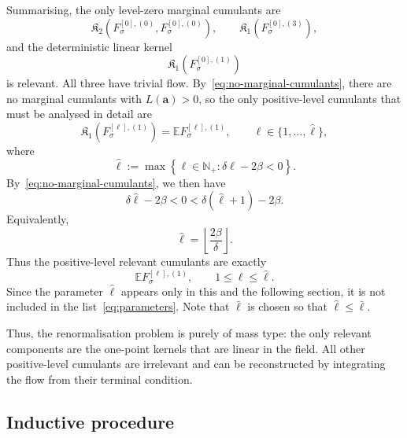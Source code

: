 \documentclass{article}
\numberwithin{equation}{section}
\newcommand{\assign}{:=}
\theoremstyle{plain}
\theoremstyle{definition}
\begin{document}
Summarising, the only level-zero marginal cumulants are
\[
  \mathfrak{K}_2 (F^{[0], (0)}_{\sigma}, F^{[0], (0)}_{\sigma}),
  \qquad
  \mathfrak{K}_1 (F_{\sigma}^{[0], (3)}),
\]
and the deterministic linear kernel
\[
  \mathfrak{K}_1 (F_{\sigma}^{[0], (1)})
\]
is relevant. All three have trivial flow. By~\eqref{eq:no-marginal-cumulants},
there are no marginal cumulants with $L (\boldsymbol{a}) > 0$, so the only
positive-level cumulants that must be analysed in detail are
\begin{equation}
  \mathfrak{K}_1 (F_{\sigma}^{[\ell],(1)}) =\mathbb{E}F_{\sigma}^{[\ell],(1)},
  \qquad \ell \in \{ 1, \ldots, \hat{\ell} \}, \label{eq:relevant-cum}
\end{equation}
where
\[
  \hat{\ell} \assign \max \left\{ \ell \in \mathbb{N}_+ : \delta \ell - 2
  \beta < 0 \right\}.
\]
By~\eqref{eq:no-marginal-cumulants}, we then have
\[
  \delta \hat{\ell} - 2 \beta < 0 < \delta (\hat{\ell} + 1) - 2 \beta .
\]
Equivalently,
\[
  \hat{\ell} = \left\lfloor \frac{2 \beta}{\delta} \right\rfloor .
\]
Thus the positive-level relevant cumulants are exactly
\[
  \mathbb{E} F_{\sigma}^{[\ell], (1)},
  \qquad 1 \leqslant \ell \leqslant \hat{\ell} .
\]
Since the parameter $\hat{\ell}$ appears only in this and
the following section, it is not included in the list~\eqref{eq:parameters}.
Note that $\bar\ell$ is chosen so that $\hat\ell\leq\bar\ell$.

Thus, the renormalisation problem is purely of
mass type: the only relevant components are the one-point kernels that are
linear in the field. All other positive-level cumulants are irrelevant and
can be reconstructed by integrating the flow from their terminal condition.

\subsection{Inductive procedure}\label{sec:induction}
\end{document}
